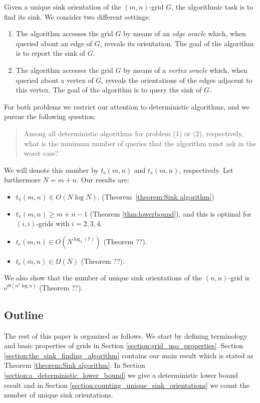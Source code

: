 \documentclass[a4paper,10pt]{article}
\newcommand{\timeEdge}{\ensuremath{t_\mathrm{e}}}
\newcommand{\timeVertex}{\ensuremath{t_\mathrm{v}}}
\newcommand{\e}{\ensuremath{\mathrm{e}}}
\begin{document}
Given a unique sink orientation of the $(m,n)$-grid $G$, the algorithmic task
is to find its sink. 
We consider two different settings:
\begin{enumerate}[\quad (1)]
    \item
        The algorithm accesses the grid $G$ by means of an \emph{edge oracle}
        which, when queried about an edge of $G$, reveals its orientation.
        The goal of the algorithm is to report the sink of $G$.

    \item
        The algorithm accesses the grid $G$ by means of a \emph{vertex oracle}
        which, when queried about a vertex of $G$, reveals the orientations of
        the edges adjacent to this vertex.
        The goal of the algorithm is to query the sink of $G$.

\end{enumerate}
For both problems we restrict our attention to deterministic algorithms, and
we pursue the following question:
\begin{quote}
    Among all deterministic algorithms for problem (1) or (2), respectively,
    what is the minimum number of queries that the algorithm must ask in the
    worst case?
\end{quote}
We will denote this number by $\timeEdge(m,n)$ and
$\timeVertex(m,n)$, respectively.
Let furthermore $N = m + n$.
Our results are:

\begin{itemize}
    \item
        $\timeVertex(m,n) \in O(N \log N)$. (Theorem~\ref{theorem:Sink algorithm})
    \item
        $\timeVertex(m,n) \ge m+n-1$ (Theorem \ref{thm:lowerbound}), and this is optimal for $(i,i)$-grids with $i = 2, 3, 4$. 
    \item
        $\timeEdge(m,n) \in O(N ^ { \log_4(7) })$ (Theorem ??).
    \item
        $\timeEdge(m,n) \in \Omega(N)$ (Theorem ??).
\end{itemize}
We also show that the number of unique sink orientations of the $(n,n)$-grid
is $\e^{ \Theta(n^2 \log n) }$ (Theorem ??).

\subsection{Outline}

The rest of this paper is organized as follows. We start by defining terminology and basic properties of grids in Section \ref{section:grid_uso_properties}. Section \ref{section:the_sink_finding_algorithm} contains our main result which is stated as Theorem \ref{theorem:Sink algorithm}. In Section \ref{section:a_deterministic_lower_bound} we give a deterministic lower bound result and in Section \ref{section:counting_unique_sink_orientations} we count the number of unique sink orientations.
\end{document}
